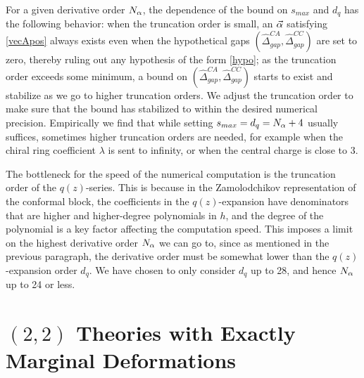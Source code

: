 \documentclass[12pt]{article}
\begin{document}

%
%

For a given derivative order $N_{\alpha}$, the dependence of the bound on $s_{max}$ and $d_q$
has the following behavior:  when the truncation order is small, an $\vec{{\alpha}}$ satisfying \eqref{vecApos} always exists even when the hypothetical gaps $(\widehat\Delta^{CA}_{gap}, \widehat\Delta^{CC}_{gap})$ are set to zero, thereby ruling out any hypothesis of the form \eqref{hypo}; as the truncation order exceeds some minimum, a bound on $(\widehat\Delta^{CA}_{gap}, \widehat\Delta^{CC}_{gap})$ starts to exist and stabilize as we go to higher truncation orders.  We adjust the truncation order to make sure that the bound has stabilized to within the desired numerical precision.  Empirically we find that while setting $s_{max} = d_q = N_{\alpha} + 4$ usually suffices, sometimes higher truncation orders are needed, for example when the chiral ring coefficient $\lambda$ is sent to infinity, or when the central charge is close to 3.  



The bottleneck for the speed of the numerical computation is the truncation order of the $q(z)$-series.  This is because in the Zamolodchikov representation of the conformal block, the coefficients in the $q(z)$-expansion have denominators that are higher and higher-degree polynomials in $h$, and the degree of the polynomial is a key factor affecting the computation speed.  This imposes a limit on the highest derivative order $N_{\alpha}$ we can go to, since as mentioned in the previous paragraph, the derivative order must be somewhat lower than the $q(z)$-expansion order $d_q$.  We have chosen to only consider $d_q$ up to 28, and hence $N_{\alpha}$ up to 24 or less.


\section{$(2,2)$ Theories with Exactly Marginal Deformations}
\end{document}
